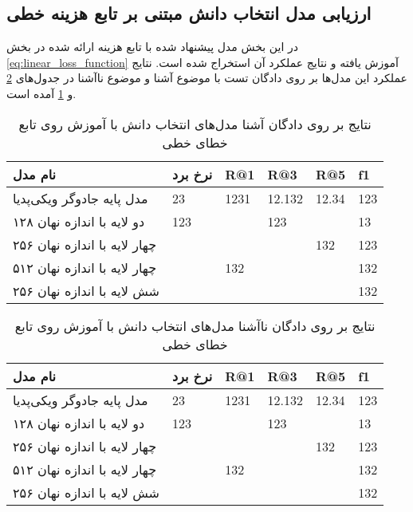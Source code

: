 \subsection{ارزیابی مدل انتخاب دانش مبتنی بر تابع هزینه خطی}

در این بخش مدل‌ پیشنهاد شده با تابع هزینه ارائه شده در بخش 
\ref{eq:linear_loss_function}
آموزش یافته و نتایج عملکرد آن استخراج شده است. نتایج عملکرد این مدل‌ها بر روی دادگان تست با موضوع آشنا و موضوع ناآشنا در جدول‌های 
\ref{table:knowledge:lin:unseen}
و 
\ref{table:knowledge:lin:seen}
آمده است.

\begin{table}[h]
	\caption{نتایج بر روی دادگان آشنا مدل‌های انتخاب دانش با آموزش روی تابع خطای خطی }
	\centering
	\label{table:knowledge:lin:seen}
	\begin{tabular}{|l|l|l|l|l|l|}
		\hline
		نام مدل                      & نرخ برد & R@1  & R@3    & R@5   & f1  \\ \hline
		مدل پایه جادوگر ویکی‌پدیا    & 23      & 1231 & 12.132 & 12.34 & 123 \\ \hline
		دو لایه با اندازه نهان ۱۲۸   & 123     &      & 123    &       & 13  \\ \hline
		چهار لایه با اندازه نهان ۲۵۶ &         &      &        & 132   & 123 \\ \hline
		چهار لایه با اندازه نهان ۵۱۲ &         & 132  &        &       & 132 \\ \hline
		شش لایه با اندازه نهان ۲۵۶   &         &      &        &       & 132 \\ \hline
	\end{tabular}
\end{table}

\begin{table}[h]
	\caption{نتایج بر روی دادگان ناآشنا مدل‌های انتخاب دانش با آموزش روی تابع خطای خطی }
	\centering
	\label{table:knowledge:lin:unseen}
	\begin{tabular}{|l|l|l|l|l|l|}
		\hline
		نام مدل                      & نرخ برد & R@1  & R@3    & R@5   & f1  \\ \hline
		مدل پایه جادوگر ویکی‌پدیا    & 23      & 1231 & 12.132 & 12.34 & 123 \\ \hline
		دو لایه با اندازه نهان ۱۲۸   & 123     &      & 123    &       & 13  \\ \hline
		چهار لایه با اندازه نهان ۲۵۶ &         &      &        & 132   & 123 \\ \hline
		چهار لایه با اندازه نهان ۵۱۲ &         & 132  &        &       & 132 \\ \hline
		شش لایه با اندازه نهان ۲۵۶   &         &      &        &       & 132 \\ \hline
	\end{tabular}
\end{table}


